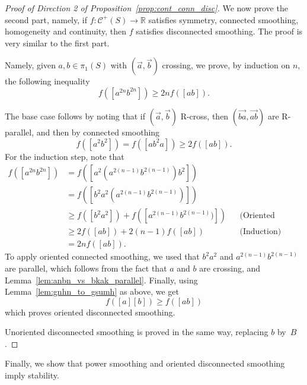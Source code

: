 \documentclass[11pt]{amsart}
\newcommand{\ora}[1]{\overrightarrow{#1}}
\numberwithin{equation}{section}
\numberwithin{figure}{section}
\theoremstyle{definition}
\theoremstyle{plain}
\newcommand{\Curves}{\mathcal{C}}
\begin{document}
\begin{proof}[Proof of Direction 2 of Proposition~\ref{prop:cont_conn_disc}]
		
		We now prove the second part, namely, if $f \colon \Curves^+(S) \to \mathbb{R}$ satisfies symmetry, connected smoothing, homogeneity and continuity, then $f$ satisfies disconnected smoothing. The proof is very similar to the first part.
			
			 Namely, given $a, b \in \pi_1(S)$ with $(\ora{a},\ora{b})$ crossing, we prove, by induction on $n$, the following inequality
			\begin{equation}
				f([a^{2n}b^{2n}]) \geq 2nf([ab]).
				\label{eq:inequality_smoothing}
			\end{equation}
			
			The base case follows by noting that if $(\ora{a},\ora{b})$ R-cross, then $(\ora{ba},\ora{ab})$ are R-parallel, and then by connected smoothing
			\[
			f([a^2b^2])=f([ab^2a]) \geq 2f([ab]).
			\]
			For the induction step, note that
			\begin{align*}
				f([a^{2n}b^{2n}]) &= f([a^2(a^{2(n-1)}b^{2(n-1)})b^2])\\
				&= f([b^2a^2(a^{2(n-1)}b^{2(n-1)})]) \\
				&\geq f([b^2a^2]) + f([a^{2(n-1)}b^{2(n-1)})]) && \text{(Oriented connected smoothing)} \\
				&\geq 2f([ab]) + 2(n-1)f([ab]) && \text{(Induction)} \\
                &= 2nf([ab]).
			\end{align*}
			To apply oriented connected smoothing, we used that $b^2a^2$ and $a^{2(n-1)}b^{2(n-1)}$ are parallel, which follows from the fact that $a$ and $b$ are crossing, and Lemma~\ref{lem:anbn_vs_bkak_parallel}. 
			Finally, using Lemma~\ref{lem:gnhn_to_gsumh} as above, we get
			\[
			f([a] [b]) \geq f([ab])
			\]
			which proves oriented disconnected smoothing.
	
			Unoriented disconnected smoothing is proved in the same way, replacing
			$b$ by~$B$.
\end{proof}

Finally, we show that power smoothing and oriented disconnected smoothing imply stability.
\end{document}
